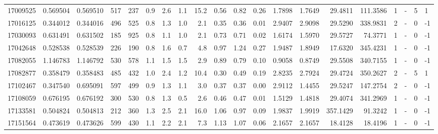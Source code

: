 \begin{tabular}{rrrrrrrrrrrrrrrrrlrl}
  17009525 & 0.569504 &   0.569510 &  517 &  237 &      0.9 &      2.6 &     1.1 &     15.2 &       0.56 &        0.82 &        0.26 &  1.7898 &  1.7649 &   29.4811 &  111.3586 &       1 &             - &        5 &         1 \\
  17016125 & 0.344012 &   0.344016 &  496 &  525 &      0.8 &      1.3 &     1.0 &      2.1 &       0.35 &        0.36 &        0.01 &  2.9407 &  2.9098 &   29.5290 &  338.9831 &       2 &             - &        0 &        -1 \\
  17030093 & 0.631491 &   0.631502 &  185 &  925 &      0.8 &      1.1 &     1.0 &      2.1 &       0.73 &        0.71 &        0.02 &  1.6174 &  1.5970 &   29.5727 &   74.3771 &       1 &             - &        0 &        -1 \\
  17042648 & 0.528538 &   0.528539 &  226 &  190 &      0.8 &      1.6 &     0.7 &      4.8 &       0.97 &        1.24 &        0.27 &  1.9487 &  1.8949 &   17.6320 &  345.4231 &       1 &             - &        0 &        -1 \\
  17082055 & 1.146783 &   1.146792 &  530 &  578 &      1.1 &      1.5 &     1.5 &      2.9 &       0.89 &        0.79 &        0.10 &  0.9058 &  0.8749 &   29.5508 &  340.7155 &       1 &             - &        0 &        -1 \\
  17082877 & 0.358479 &   0.358483 &  485 &  432 &      1.0 &      2.4 &     1.2 &     10.4 &       0.30 &        0.49 &        0.19 &  2.8235 &  2.7924 &   29.4724 &  350.2627 &       2 &             - &        5 &         1 \\
  17102467 & 0.347540 &   0.695091 &  597 &  499 &      0.9 &      1.3 &     1.1 &      3.0 &       0.37 &        0.37 &        0.00 &  2.9112 &  1.4455 &   29.5247 &  147.2754 &       2 &             - &        0 &        -1 \\
  17108059 & 0.676195 &   0.676192 &  300 &  530 &      0.8 &      1.3 &     0.5 &      2.6 &       0.46 &        0.47 &        0.01 &  1.5129 &  1.4818 &   29.4074 &  341.2969 &       1 &             - &        0 &        -1 \\
  17133581 & 0.504824 &   0.504813 &  212 &  360 &      1.3 &      2.5 &     2.1 &     16.0 &       1.06 &        0.97 &        0.09 &  1.9837 &  1.9919 &  357.1429 &   91.3242 &       1 &             - &        0 &        -1 \\
  17151564 & 0.473619 &   0.473626 &  599 &  430 &      1.1 &      2.2 &     2.1 &      7.3 &       1.13 &        1.07 &        0.06 &  2.1657 &  2.1657 &   18.4128 &   18.4196 &       1 &             - &        0 &        -1 \\

\end{tabular}
